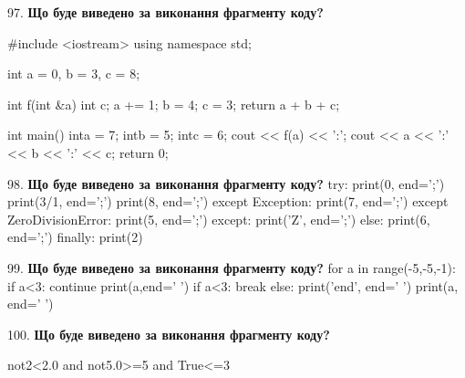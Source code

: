 \documentclass[11pt]{article}
\begin{document}
97. \textbf{Що буде виведено за виконання фрагменту коду?}

#include <iostream>
using namespace std;

int a = 0, b = 3, c = 8;

int f(int &a){
int c;    a += 1;
    b = 4;
    c = 3;
    return a + b + c;
}

int main(){
    inta = 7;
    intb = 5;
    intc = 6;
    cout << f(a) << ':';
    cout << a << ':' << b << ':' << c;
    return 0; 
}
\par\vspace{5mm}

98. \textbf{Що буде виведено за виконання фрагменту коду?}
try:
    print(0, end=';')
    print(3/1, end=';')
    print(8, end=';')
except Exception:
    print(7, end=';')
except ZeroDivisionError:
    print(5, end=';')
except:
    print('Z', end=';')
else:
    print(6, end=';')
finally:
    print(2)
\par\vspace{5mm}

99. \textbf{Що буде виведено за виконання фрагменту коду?}
for a in range(-5,-5,-1):
    if a<3:
        continue
        print(a,end=' ')
    if a<3:
        break
else:
    print('end', end=' ')
print(a, end=' ')
\par\vspace{5mm}

100. \textbf{Що буде виведено за виконання фрагменту коду?}

not2<2.0 and not5.0>=5 and True<=3
\par\vspace{5mm}

\newpage
\end{document}
